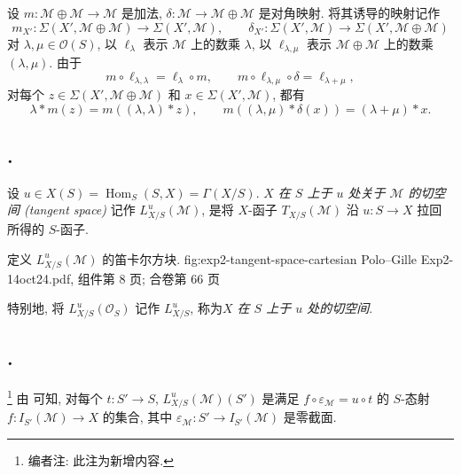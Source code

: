 设 \(m:\mathcal M\oplus\mathcal M\to\mathcal M\) 是加法,
\(\delta:\mathcal M\to\mathcal M\oplus\mathcal M\) 是对角映射.
将其诱导的映射记作
\[
  m_{X'}:\Sigma(X',\mathcal M\oplus\mathcal M)\to
    \Sigma(X',\mathcal M),
  \qquad
  \delta_{X'}:\Sigma(X',\mathcal M)\to
    \Sigma(X',\mathcal M\oplus\mathcal M)
\]
对 \(\lambda,\mu\in\mathcal O(S)\), 以 \(\ell_\lambda\) 表示
\(\mathcal M\) 上的数乘 \(\lambda\), 以 \(\ell_{\lambda,\mu}\)
表示 \(\mathcal M\oplus\mathcal M\) 上的数乘
\((\lambda,\mu)\). 由于
\[
  m\circ\ell_{\lambda,\lambda}=\ell_\lambda\circ m,
  \qquad
  m\circ\ell_{\lambda,\mu}\circ\delta=\ell_{\lambda+\mu},
\]
对每个 \(z\in\Sigma(X',\mathcal M\oplus\mathcal M)\) 和
\(x\in\Sigma(X',\mathcal M)\), 都有
\begin{equation}
  \lambda*m(z)=m((\lambda,\lambda)*z),
  \qquad
  m((\lambda,\mu)*\delta(x))=(\lambda+\mu)*x.
  \tag{$\dagger$}\label{sga3:ii:section:3:equation:dagger}
\end{equation}

\subsection*{.}
设 \(u\in X(S)=\operatorname{Hom}_S(S,X)=\Gamma(X/S)\).
\emph{\(X\) 在 \(S\) 上于 \(u\) 处关于 \(\mathcal M\) 的切空间
(tangent space)} 记作 \(L^u_{X/S}(\mathcal M)\), 是将 \(X\)-函子
\(T_{X/S}(\mathcal M)\) 沿 \(u:S\to X\) 拉回所得的 \(S\)-函子.

  {定义 \(L^u_{X/S}(\mathcal M)\) 的笛卡尔方块.}
  {fig:exp2-tangent-space-cartesian}
  {Polo--Gille Exp2-14oct24.pdf, 组件第 8 页; 合卷第 66 页}

特别地, 将 \(L^u_{X/S}(\mathcal O_S)\) 记作 \(L^u_{X/S}\),
称为\emph{\(X\) 在 \(S\) 上于 \(u\) 处的切空间}.

\subsection*{.}
\footnote{编者注: 此注为新增内容.}
由  可知,
对每个 \(t:S'\to S\), \(L^u_{X/S}(\mathcal M)(S')\) 是满足
\(f\circ\varepsilon_{\mathcal M}=u\circ t\) 的 \(S\)-态射
\(f:I_{S'}(\mathcal M)\to X\) 的集合, 其中
\(\varepsilon_{\mathcal M}:S'\to I_{S'}(\mathcal M)\) 是零截面.

